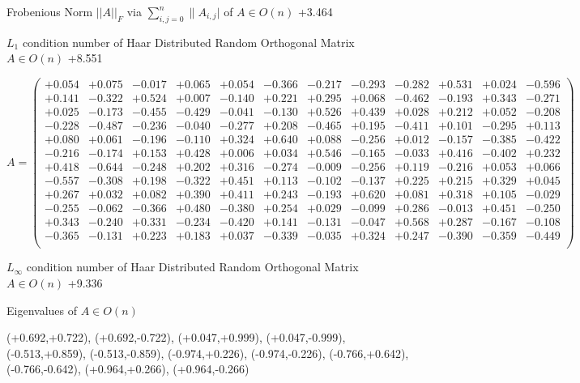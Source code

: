 \documentclass[9pt]{article}
\theoremstyle{plain}
\theoremstyle{definition}
\theoremstyle{remark}
\numberwithin{equation}{section}
\begin{document}
Frobenious Norm  $||A||_{\textit{F}}$ via $\sum\limits_{i,j =0}^{n} \|A_{i,j}|$   of  $A \in O(n)$  +3.464

$L_1$ condition number of Haar Distributed Random Orthogonal Matrix $A \in O(n)$ +8.551

$A = \left(
\begin{array}{
cccccccccccc}
+0.054 & +0.075 & -0.017 & +0.065 & +0.054 & -0.366 & -0.217 & -0.293 & -0.282 & +0.531 & +0.024 & -0.596 \\
+0.141 & -0.322 & +0.524 & +0.007 & -0.140 & +0.221 & +0.295 & +0.068 & -0.462 & -0.193 & +0.343 & -0.271 \\
+0.025 & -0.173 & -0.455 & -0.429 & -0.041 & -0.130 & +0.526 & +0.439 & +0.028 & +0.212 & +0.052 & -0.208 \\
-0.228 & -0.487 & -0.236 & -0.040 & -0.277 & +0.208 & -0.465 & +0.195 & -0.411 & +0.101 & -0.295 & +0.113 \\
+0.080 & +0.061 & -0.196 & -0.110 & +0.324 & +0.640 & +0.088 & -0.256 & +0.012 & -0.157 & -0.385 & -0.422 \\
-0.216 & -0.174 & +0.153 & +0.428 & +0.006 & +0.034 & +0.546 & -0.165 & -0.033 & +0.416 & -0.402 & +0.232 \\
+0.418 & -0.644 & -0.248 & +0.202 & +0.316 & -0.274 & -0.009 & -0.256 & +0.119 & -0.216 & +0.053 & +0.066 \\
-0.557 & -0.308 & +0.198 & -0.322 & +0.451 & +0.113 & -0.102 & -0.137 & +0.225 & +0.215 & +0.329 & +0.045 \\
+0.267 & +0.032 & +0.082 & +0.390 & +0.411 & +0.243 & -0.193 & +0.620 & +0.081 & +0.318 & +0.105 & -0.029 \\
-0.255 & -0.062 & -0.366 & +0.480 & -0.380 & +0.254 & +0.029 & -0.099 & +0.286 & -0.013 & +0.451 & -0.250 \\
+0.343 & -0.240 & +0.331 & -0.234 & -0.420 & +0.141 & -0.131 & -0.047 & +0.568 & +0.287 & -0.167 & -0.108 \\
-0.365 & -0.131 & +0.223 & +0.183 & +0.037 & -0.339 & -0.035 & +0.324 & +0.247 & -0.390 & -0.359 & -0.449 \\
\end{array}
\right)$ \newline 

$L_{\infty}$ condition number of Haar Distributed Random Orthogonal Matrix $A \in O(n)$ +9.336

Eigenvalues of $A \in O(n)$

(+0.692,+0.722), (+0.692,-0.722), (+0.047,+0.999), (+0.047,-0.999), (-0.513,+0.859), (-0.513,-0.859), (-0.974,+0.226), (-0.974,-0.226), (-0.766,+0.642), (-0.766,-0.642), (+0.964,+0.266), (+0.964,-0.266)
\end{document}
